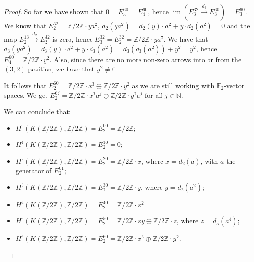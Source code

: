 \documentclass{article}
\newcommand{\numberset}{\mathbb}
\newcommand{\N}{\numberset{N}}
\newcommand{\Z}{\numberset{Z}}
\newcommand{\F}{\numberset{F}}
\DeclareMathOperator{\im}{im}
\begin{document}
\begin{proof}
    So far we have shown that $0=E^{60}_5=E^{60}_4$, hence
    $\im(E^{32}_3\xrightarrow{d_3}E^{60}_3)=E^{60}_3$. We know that
    $E^{32}_2=\Z/2\Z\cdot ya^2$, $d_2(ya^2)=d_2(y)\cdot a^2+y\cdot d_2(a^2)=0$
    and the map $E^{13}_2\xrightarrow{d_2}E^{32}_2$ is zero, hence
    $E^{32}_3=E^{32}_2=\Z/2\Z\cdot ya^2$. We have that $d_3(ya^2)=d_3(y)\cdot
    a^2+y\cdot d_3(a^2)=d_3(d_3(a^2))+y^2=y^2$, hence $E^{60}_4=\Z/2\Z\cdot
    y^2$. Also, since there are no more non-zero arrows into or from the
    $(3,2)$-position, we have that $y^2\neq 0$.
    
    It follows that $E^{60}_2=\Z/2\Z\cdot x^3\oplus\Z/2\Z\cdot y^2$ as we
    are still working with $\F_2$-vector spaces. We get 
    $E^{6j}_2=\Z/2\Z\cdot x^3a^j\oplus\Z/2\Z\cdot y^2a^j$ for all $j\in\N$.

    We can conclude that:
    \begin{itemize}
        \item $H^0(K(\Z/2\Z),\Z/2\Z)=E^{00}_2=\Z/2\Z$;
        \item $H^1(K(\Z/2\Z),\Z/2\Z)=E^{10}_2=0$;
        \item $H^2(K(\Z/2\Z),\Z/2\Z)=E^{20}_2=\Z/2\Z\cdot x$, where
            $x=d_2(a)$, with $a$ the generator of $E^{01}_2$;
        \item $H^3(K(\Z/2\Z),\Z/2\Z)=E^{30}_2=\Z/2\Z\cdot y$, where
            $y=d_3(a^2)$;
        \item $H^4(K(\Z/2\Z),\Z/2\Z)=E^{40}_2=\Z/2\Z\cdot x^2$
        \item $H^5(K(\Z/2\Z),\Z/2\Z)=E^{50}_2=\Z/2\Z\cdot xy\oplus\Z/2\Z\cdot
            z$, where $z=d_5(a^4)$;
        \item $H^6(K(\Z/2\Z),\Z/2\Z)=E^{60}_2=\Z/2\Z\cdot
            x^3\oplus\Z/2\Z\cdot y^2$.
    \end{itemize}
\end{proof}

\printbibliography
\end{document}

